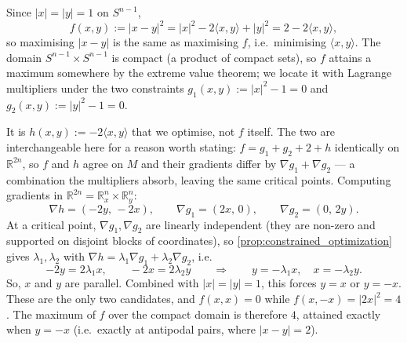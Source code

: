 \begin{exercisesolution}
\label{sol:antipodal_max_distance}
Since $|x|=|y|=1$ on $S^{n-1}$,
\[f(x,y) := |x-y|^2 = |x|^2 - 2\langle x,y\rangle + |y|^2 = 2 - 2\langle x,y\rangle,\]
so maximising $|x-y|$ is the same as maximising $f$, i.e.\ minimising $\langle x,y\rangle$.
The domain $S^{n-1}\times S^{n-1}$ is compact (a product of compact sets), so $f$ attains a
maximum somewhere by the extreme value theorem; we locate it with Lagrange multipliers under the
two constraints $g_1(x,y) := |x|^2-1 = 0$ and $g_2(x,y) := |y|^2-1=0$.

It is $h(x,y) := -2\langle x,y\rangle$ that we optimise, not $f$ itself. The two are interchangeable
here for a reason worth stating: $f = g_1 + g_2 + 2 + h$ identically on $\mathbb{R}^{2n}$, so $f$
and $h$ agree on $M$ and their gradients differ by $\nabla g_1 + \nabla g_2$ --- a combination the
multipliers absorb, leaving the same critical points. Computing gradients in
$\mathbb{R}^{2n} = \mathbb{R}^n_x \times \mathbb{R}^n_y$:
\[\nabla h = (-2y,\,-2x), \qquad \nabla g_1 = (2x,\,0), \qquad \nabla g_2 = (0,\,2y).\]
At a critical point, $\nabla g_1,\nabla g_2$ are linearly independent (they are non-zero and
supported on disjoint blocks of coordinates), so \cref{prop:constrained_optimization} gives
$\lambda_1,\lambda_2$ with $\nabla h = \lambda_1\nabla g_1 + \lambda_2\nabla g_2$, i.e.\
\[-2y = 2\lambda_1x, \qquad -2x = 2\lambda_2y \qquad\Longrightarrow\qquad
  y = -\lambda_1x, \quad x=-\lambda_2y.\]
So, $x$ and $y$ are parallel. Combined with $|x|=|y|=1$, this forces $y = x$ or $y=-x$.
These are the only two candidates, and $f(x,x) = 0$ while $f(x,-x) = |2x|^2 = 4$. The maximum
of $f$ over the compact domain is therefore $4$, attained exactly when $y=-x$ (i.e.\ exactly at
antipodal pairs, where $|x-y| = 2$).
\end{exercisesolution}

